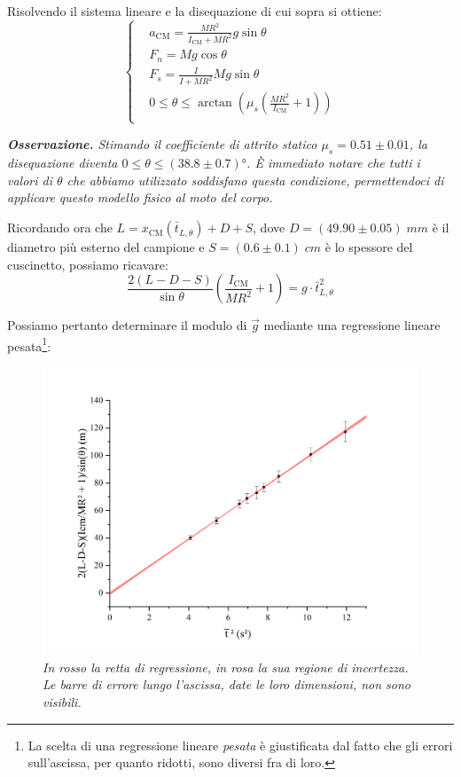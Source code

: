 \documentclass{article}
\begin{document}
Risolvendo il sistema lineare e la disequazione di cui sopra si ottiene:
\[\left\{\begin{aligned}
    &a_\text{CM} = \frac{M R^2}{I_\text{CM} + M R^2} g\sin\theta \\
    &F_n = M g \cos\theta \\
    &F_s = \frac{I}{I + M R^2} M g \sin\theta \\
    & 0 \le \theta \le \arctan\left(\mu_s \left(\frac{MR^2}{I_\text{CM}} + 1\right)\right) \\
\end{aligned}\right.\]

\emph{\textbf{Osservazione.}
    Stimando il coefficiente di attrito statico $\mu_s = 0.51\pm0.01$,
    la disequazione diventa $0 \le \theta \le (38.8 \pm 0.7)\unit{\degree}$.
    È immediato notare che tutti i valori di $\theta$ che abbiamo utilizzato
    soddisfano questa condizione, permettendoci di applicare questo
    modello fisico al moto del corpo.
}

Ricordando ora che $L = x_\text{CM}(\bar{t}_{L,\theta}) + D + S$,
dove $D = (49.90\pm0.05)\;\unit{mm}$ è il diametro più esterno del campione e
$S = (0.6\pm0.1)\;\unit{cm}$ è lo spessore del cuscinetto, possiamo ricavare:
\[
    \frac{2(L-D-S)}{\sin\theta}\left(\frac{I_\text{CM}}{M R^2} + 1\right) = g \cdot \bar{t}_{L,\theta}^2
\]

Possiamo pertanto determinare il modulo di $\vec{g}$ mediante una regressione
lineare pesata\footnote[2]{
    La scelta di una regressione lineare \emph{pesata} è giustificata dal fatto
    che gli errori sull'ascissa, per quanto ridotti, sono diversi fra di loro.
}:
\begin{figure}[H]
    \includegraphics[trim={1cm 0.6cm 1cm 1cm},clip,width=\textwidth]{img/regressione.jpg}
    \caption*{\emph{
        In rosso la retta di regressione, in rosa la sua regione di incertezza. \\
        Le barre di errore lungo l'ascissa, date le loro dimensioni, non sono visibili.
    }}
\end{figure}
\end{document}
